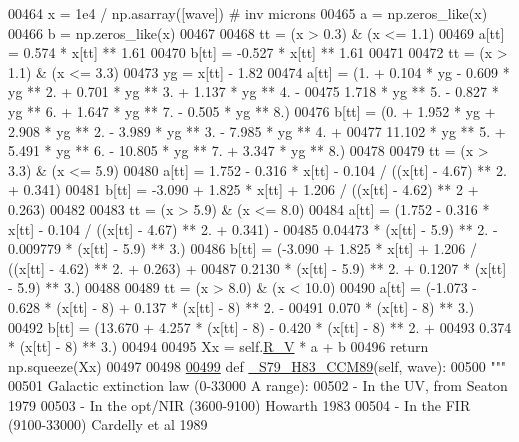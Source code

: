 \begin{DoxyCode}
00464         x = 1e4 / np.asarray([wave]) \textcolor{comment}{# inv microns}
00465         a = np.zeros\_like(x)
00466         b = np.zeros\_like(x)
00467         
00468         tt = (x > 0.3) & (x <= 1.1)
00469         a[tt] = 0.574 * x[tt] ** 1.61 
00470         b[tt] = -0.527 * x[tt] ** 1.61
00471     
00472         tt = (x > 1.1) & (x <= 3.3)
00473         yg = x[tt] - 1.82
00474         a[tt] = (1. + 0.104 * yg - 0.609 * yg ** 2. + 0.701 * yg ** 3. + 1.137 * yg ** 4. - 
00475                  1.718 * yg ** 5. - 0.827 * yg ** 6. + 1.647 * yg ** 7. - 0.505 * yg ** 8.)
00476         b[tt] = (0. + 1.952 * yg + 2.908 * yg ** 2. - 3.989 * yg ** 3. - 7.985 * yg ** 4. + 
00477                  11.102 * yg ** 5. + 5.491 * yg ** 6. - 10.805 * yg ** 7. + 3.347 * yg ** 8.)
00478         
00479         tt = (x > 3.3) & (x <= 5.9)
00480         a[tt] = 1.752 - 0.316 * x[tt] - 0.104 / ((x[tt] - 4.67) ** 2. + 0.341)
00481         b[tt] = -3.090 + 1.825 * x[tt] + 1.206 / ((x[tt] - 4.62) ** 2 + 0.263)
00482         
00483         tt = (x > 5.9) & (x <= 8.0)
00484         a[tt] = (1.752 - 0.316 * x[tt] - 0.104 / ((x[tt] - 4.67) ** 2. + 0.341) - 
00485                  0.04473 * (x[tt] - 5.9) ** 2. - 0.009779 * (x[tt] - 5.9) ** 3.)
00486         b[tt] = (-3.090 + 1.825 * x[tt] + 1.206 / ((x[tt] - 4.62) ** 2. + 0.263) + 
00487                  0.2130 * (x[tt] - 5.9) ** 2. + 0.1207 * (x[tt] - 5.9) ** 3.)
00488         
00489         tt = (x > 8.0) & (x < 10.0)
00490         a[tt] = (-1.073 - 0.628 * (x[tt] - 8) + 0.137 * (x[tt] - 8) ** 2. - 
00491                  0.070 * (x[tt] - 8) ** 3.)
00492         b[tt] = (13.670 + 4.257 * (x[tt] - 8) - 0.420 * (x[tt] - 8) ** 2. + 
00493                  0.374 * (x[tt] - 8) ** 3.)
00494         
00495         Xx = self.\hyperlink{classpyneb_1_1extinction_1_1red__corr_1_1_red_corr_a4696ecdd84c912c20e6aa19b1573e875}{R\_V} * a + b
00496         \textcolor{keywordflow}{return} np.squeeze(Xx)
00497 
00498 
\hypertarget{red__corr_8py_source_l00499}{}\hyperlink{classpyneb_1_1extinction_1_1red__corr_1_1_red_corr_a758a99903861c8b015cc2074766ad811}{00499}     \textcolor{keyword}{def }\hyperlink{classpyneb_1_1extinction_1_1red__corr_1_1_red_corr_a758a99903861c8b015cc2074766ad811}{\_S79\_H83\_CCM89}(self, wave):
00500         \textcolor{stringliteral}{"""}
00501 \textcolor{stringliteral}{        Galactic extinction law (0-33000 A range):}
00502 \textcolor{stringliteral}{        - In the UV, from Seaton 1979}
00503 \textcolor{stringliteral}{        - In the opt/NIR (3600-9100) Howarth 1983}
00504 \textcolor{stringliteral}{        - In the FIR (9100-33000) Cardelly et al 1989}

\end{DoxyCode}
